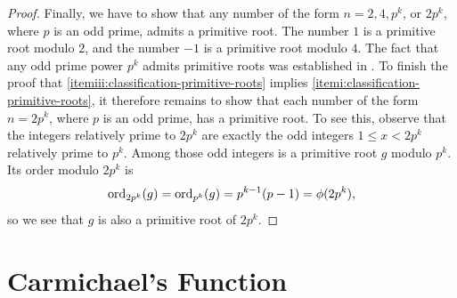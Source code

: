 \begin{proof}
  Finally, we have to show that any number of the form $n=2,4,p^k$, or $2p^k$, where $p$ is an odd prime, admits a primitive root. The number $1$ is a primitive root modulo $2$, and the number $-1$ is a primitive root modulo $4$. The fact that any odd prime power $p^k$ admits primitive roots was established in . To finish the proof that \ref{itemiii:classification-primitive-roots} implies \ref{itemi:classification-primitive-roots}, it therefore remains to show that each number of the form $n=2p^k$, where $p$ is an odd prime, has a primitive root. To see this, observe that the integers relatively prime to $2p^k$ are exactly the odd integers $1\leq x<2p^k$ relatively prime to $p^k$. Among those odd integers is a primitive root $g$ modulo $p^k$. Its order modulo $2p^k$ is
  \begin{equation*}
    \operatorname{ord}_{2p^k}(g)=\operatorname{ord}_{p^k}(g)=p^{k-1}(p-1)=\phi(2p^k),
  \end{equation*}
  so we see that $g$ is also a primitive root of $2p^k$.
\end{proof}

\section{Carmichael's Function}

